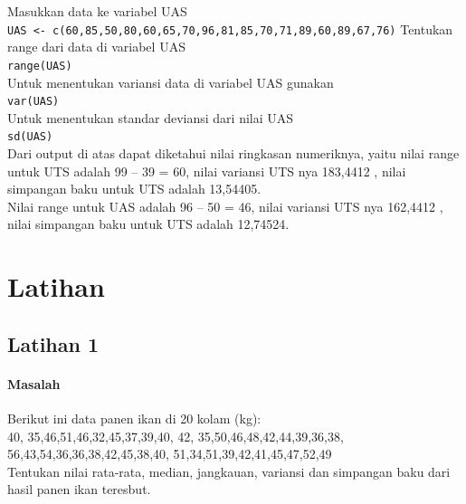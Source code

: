 \documentclass[a4paper,12pt]{article}
\begin{document}
Masukkan data ke variabel UAS\\
\texttt{UAS <- c(60,85,50,80,60,65,70,96,81,85,70,71,89,60,89,67,76)}
Tentukan range dari data di variabel UAS\\
\texttt{range(UAS)}\\
Untuk menentukan variansi data di variabel UAS gunakan\\
\texttt{var(UAS)}\\
Untuk menentukan standar deviansi dari nilai UAS\\
\texttt{sd(UAS)}\\

Dari output di atas dapat diketahui nilai ringkasan numeriknya, yaitu  nilai range untuk UTS adalah 99 – 39 = 60, nilai variansi UTS nya  183,4412 , nilai simpangan baku untuk UTS adalah 13,54405.\\
Nilai range untuk UAS adalah 96 – 50 = 46, nilai variansi UTS nya  162,4412 , nilai simpangan baku untuk UTS adalah 12,74524.

\section{Latihan}
\subsection{Latihan 1}
\paragraph{Masalah\\}
Berikut ini data panen ikan di 20 kolam (kg):\\
40, 35,46,51,46,32,45,37,39,40,
42, 35,50,46,48,42,44,39,36,38,
56,43,54,36,36,38,42,45,38,40,
51,34,51,39,42,41,45,47,52,49\\
Tentukan nilai rata-rata, median, jangkauan, variansi dan simpangan baku dari hasil panen ikan teresbut.
\end{document}
